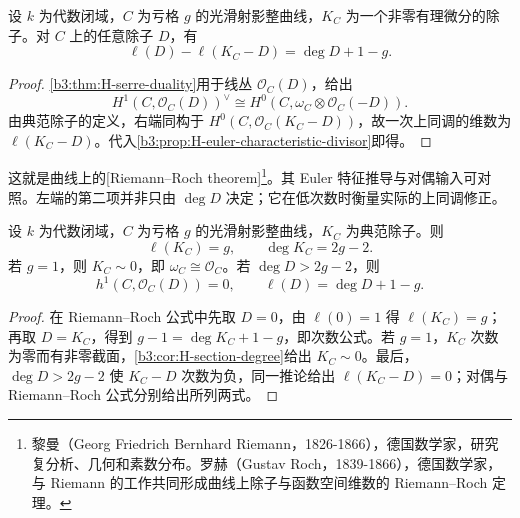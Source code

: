 \begin{theorem}\label{b3:thm:H-riemann-roch}
	设 \(k\) 为代数闭域，\(C\) 为亏格 \(g\) 的光滑射影整曲线，\(K_C\) 为一个非零有理微分的除子。对 \(C\) 上的任意除子 \(D\)，有
	\[
		\ell(D)-\ell(K_C-D)=\deg D+1-g.
	\]
\end{theorem}
\begin{proof}
	\cref{b3:thm:H-serre-duality}用于线丛 \(\mathcal O_C(D)\)，给出
	\[
		H^1(C,\mathcal O_C(D))^\vee
		\cong H^0(C,\omega_C\otimes\mathcal O_C(-D)).
	\]
	由典范除子的定义，右端同构于 \(H^0(C,\mathcal O_C(K_C-D))\)，故一次上同调的维数为 \(\ell(K_C-D)\)。代入\cref{b3:prop:H-euler-characteristic-divisor}即得。
\end{proof}

这就是曲线上的[Riemann--Roch theorem]\footnote{黎曼（Georg Friedrich Bernhard Riemann，1826-1866），德国数学家，研究复分析、几何和素数分布。罗赫（Gustav Roch，1839-1866），德国数学家，与 Riemann 的工作共同形成曲线上除子与函数空间维数的 Riemann–Roch 定理。}。其 Euler 特征推导与对偶输入可对照\cite[Chapter IV, Theorem 1.3, pp. 295--296]{Hartshorne1977}。左端的第二项并非只由 \(\deg D\) 决定；它在低次数时衡量实际的上同调修正。

\begin{corollary}\label{b3:cor:H-canonical-degree}
	设 \(k\) 为代数闭域，\(C\) 为亏格 \(g\) 的光滑射影整曲线，\(K_C\) 为典范除子。则
	\[
		\ell(K_C)=g,\qquad \deg K_C=2g-2.
	\]
	若 \(g=1\)，则 \(K_C\sim0\)，即 \(\omega_C\cong\mathcal O_C\)。若 \(\deg D>2g-2\)，则
	\[
		h^1(C,\mathcal O_C(D))=0,\qquad \ell(D)=\deg D+1-g.
	\]
\end{corollary}
\begin{proof}
	在 Riemann–Roch 公式中先取 \(D=0\)，由 \(\ell(0)=1\) 得 \(\ell(K_C)=g\)；再取 \(D=K_C\)，得到 \(g-1=\deg K_C+1-g\)，即次数公式。若 \(g=1\)，\(K_C\) 次数为零而有非零截面，\cref{b3:cor:H-section-degree}给出 \(K_C\sim0\)。最后，\(\deg D>2g-2\) 使 \(K_C-D\) 次数为负，同一推论给出 \(\ell(K_C-D)=0\)；对偶与 Riemann–Roch 公式分别给出所列两式。
\end{proof}

